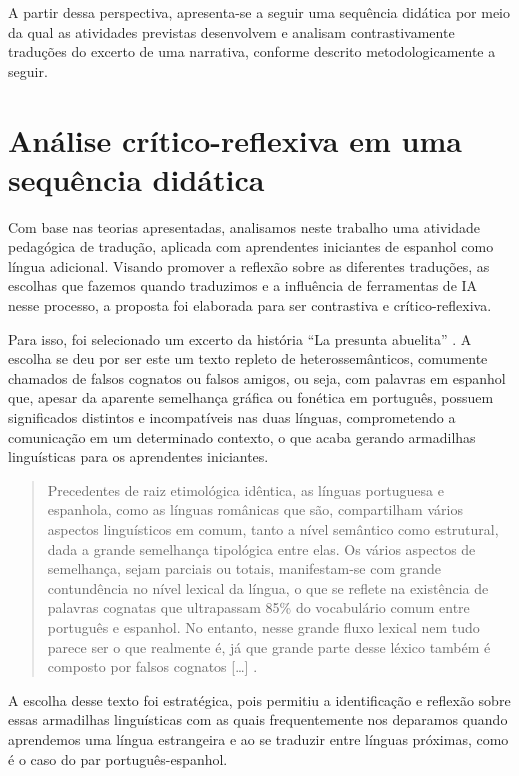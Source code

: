 \documentclass[portuguese]{textolivre}
\begin{document}
A partir dessa perspectiva, apresenta-se a seguir uma sequência didática por meio da qual as atividades previstas desenvolvem e analisam contrastivamente traduções do excerto de uma narrativa, conforme descrito metodologicamente a seguir.


\section{Análise crítico-reflexiva em uma sequência didática}\label{sec-4}
Com base nas teorias apresentadas, analisamos neste trabalho uma atividade pedagógica de tradução, aplicada com aprendentes iniciantes de espanhol como língua adicional. Visando promover a reflexão sobre as diferentes traduções, as escolhas que fazemos quando traduzimos e a influência de ferramentas de IA nesse processo, a proposta foi elaborada para ser contrastiva e crítico-reflexiva.

Para isso, foi selecionado um excerto da história “La presunta abuelita” \cite[p. 156]{bartaburu2004}. A escolha se deu por ser este um texto repleto de heterossemânticos, comumente chamados de falsos cognatos ou falsos amigos, ou seja, com palavras em espanhol que, apesar da aparente semelhança gráfica ou fonética em português, possuem significados distintos e incompatíveis nas duas línguas, comprometendo a comunicação em um determinado contexto, o que acaba gerando armadilhas linguísticas para os aprendentes iniciantes.

\begin{quote}
    Precedentes de raiz etimológica idêntica, as línguas portuguesa e espanhola, como as línguas românicas que são, compartilham vários aspectos linguísticos em comum, tanto a nível semântico como estrutural, dada a grande semelhança tipológica entre elas. Os vários aspectos de semelhança, sejam parciais ou totais, manifestam-se com grande contundência no nível lexical da língua, o que se reflete na existência de palavras cognatas que ultrapassam 85\% do vocabulário comum entre português e espanhol. No entanto, nesse grande fluxo lexical nem tudo parece ser o que realmente é, já que grande parte desse léxico também é composto por falsos cognatos […] \cite[p. 3, tradução nossa]{sousapereira2011}.
\end{quote}

A escolha desse texto foi estratégica, pois permitiu a identificação e reflexão sobre essas armadilhas linguísticas com as quais frequentemente nos deparamos quando aprendemos uma língua estrangeira e ao se traduzir entre línguas próximas, como é o caso do par português-espanhol.
\end{document}
